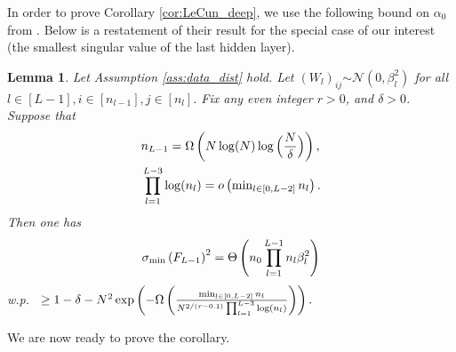 \documentclass{article}
\newcommand{\distas}[1]{\mathbin{\overset{#1}{\sim}}}
\newtheorem{lemma}[theorem]{Lemma}
\newcommand{\littleO}[1]{o\left(#1\right)}
\newcommand{\bigOmg}[1]{\Omega\left(#1\right)}
\newcommand{\bigTheta}[1]{\Theta\left(#1\right)}
\newcommand{\bigexp}[1]{\exp\left(#1\right)}
\newcommand{\svmin}[1]{\sigma_{\rm min}\left(#1\right)}
\def\min{\mathop{\rm min}\nolimits}
\begin{document}
In order to prove Corollary \ref{cor:LeCun_deep}, we use the following bound on $\alpha_0$ from \cite{QuynhNTK2021}.
Below is a restatement of their result for the special case of our interest (the smallest singular value of the last hidden layer).
\begin{lemma}\label{lem:bound_svmin_Fk}
    Let Assumption \ref{ass:data_dist} hold.
    Let $(W_l)_{ij}\distas{}\mathcal{N}(0,\beta_l^2)$ for all $l\in[L-1],i\in[n_{l-1}],j\in[n_l].$
    Fix any even integer $r>0$, and $\delta>0$.
    Suppose that
    \begin{align}
	&n_{L-1} = \bigOmg{N\log(N) \log\Big(\frac{N}{\delta}\Big)},\\
	&\prod_{l=1}^{L-3} \log(n_l)=\littleO{\min_{l\in[0,L-2]} n_l}.
    \end{align}
    Then one has
    \begin{align}
	\svmin{F_{L-1}}^2 
	=\bigTheta{ n_0\prod_{l=1}^{L-1} n_l\beta_l^2 }
    \end{align}
    w.p.\ 
	$\geq 1 - \delta - N^2 \bigexp{ - \bigOmg{ \frac{\min_{l\in[0,L-2]}n_l}{N^{2/(r-0.1)} \prod_{l=1}^{L-3}\log(n_l)} } } .$
\end{lemma}
We are now ready to prove the corollary.
\end{document}
